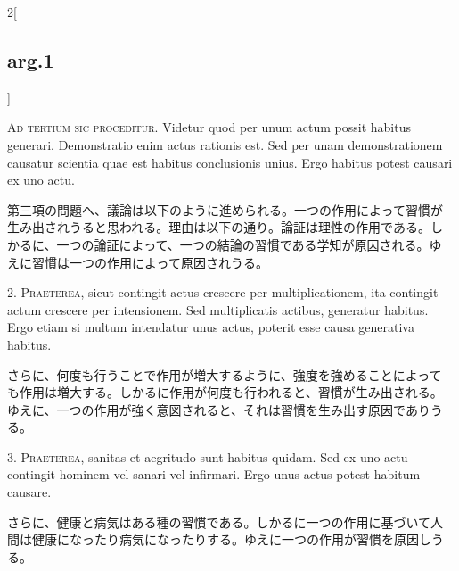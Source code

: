 \documentclass[paper=a4paper,fontsize=10pt,jafontsize=9pt,titlepage]{jlreq}
\begin{document}
\begin{paracol}{2}[\subsection{arg.1}]

{\scshape Ad tertium sic proceditur}. Videtur quod per unum actum
possit habitus generari. Demonstratio enim actus rationis est. Sed per
unam demonstrationem causatur scientia quae est habitus conclusionis
unius. Ergo habitus potest causari ex uno actu.

\switchcolumn

第三項の問題へ、議論は以下のように進められる。一つの作用によって習慣が
生み出されうると思われる。理由は以下の通り。論証は理性の作用である。し
かるに、一つの論証によって、一つの結論の習慣である学知が原因される。ゆ
えに習慣は一つの作用によって原因されうる。


2. {\scshape Praeterea}, sicut contingit actus crescere per
multiplicationem, ita contingit actum crescere per intensionem. Sed
multiplicatis actibus, generatur habitus. Ergo etiam si multum
intendatur unus actus, poterit esse causa generativa habitus.

\switchcolumn

さらに、何度も行うことで作用が増大するように、強度を強めることによって
も作用は増大する。しかるに作用が何度も行われると、習慣が生み出される。
ゆえに、一つの作用が強く意図されると、それは習慣を生み出す原因でありう
る。


3. {\scshape Praeterea}, sanitas et aegritudo sunt habitus quidam. Sed
ex uno actu contingit hominem vel sanari vel infirmari. Ergo unus
actus potest habitum causare.

\switchcolumn

さらに、健康と病気はある種の習慣である。しかるに一つの作用に基づいて人
間は健康になったり病気になったりする。ゆえに一つの作用が習慣を原因しう
る。

\switchcolumn*[\subsection{s.c.}]


\end{paracol}
\end{document}
